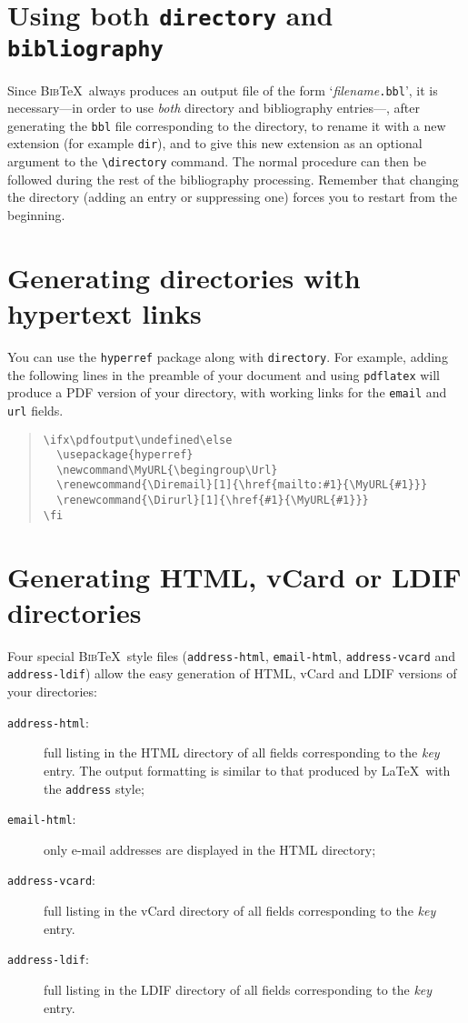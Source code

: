 \documentclass[10pt]{article}
\newcommand\MyURL{\begingroup\Url}
\renewcommand{\Diremail}[1]{\href{mailto:#1}{\MyURL{#1}}}
\renewcommand{\Dirurl}[1]{\href{#1}{\MyURL{#1}}}
\newcommand{\BibTeX}{\textsc{Bib}\TeX}
\newcommand{\Quote}[1]{`{#1}'}
\begin{document}
\section{Using both \texttt{directory} and \texttt{bibliography}}
\label{sec:usingboth}

Since \BibTeX\ always produces an output file of the form
\Quote{\emph{filename}\texttt{.bbl}}, it is necessary---in order to use \emph{both} 
directory and bibliography entries---, after generating the \texttt{bbl} file
corresponding to the directory, to rename it with a new extension (for example
\texttt{dir}), and to give this new extension as an optional argument to the
\verb'\directory' command. The normal procedure can then be followed during the
rest of the bibliography processing. Remember that changing the directory
(adding an entry or suppressing one) forces you to restart from the beginning. 

\section{Generating directories with hypertext links}

You can use the \texttt{hyperref} package along with \texttt{directory}. For
example, adding the following lines in the preamble of your document and
using \texttt{pdflatex} will produce a PDF version of your directory, with
working links for the \verb'email' and \verb'url' fields.

\begin{quote}
\begin{verbatim}
\ifx\pdfoutput\undefined\else
  \usepackage{hyperref}
  \newcommand\MyURL{\begingroup\Url}
  \renewcommand{\Diremail}[1]{\href{mailto:#1}{\MyURL{#1}}}
  \renewcommand{\Dirurl}[1]{\href{#1}{\MyURL{#1}}}
\fi
\end{verbatim}
\end{quote}

\section{Generating HTML, vCard or LDIF directories}

Four special \BibTeX\ style files (\texttt{address-html},
\texttt{email-html}, \texttt{address-vcard} and \texttt{address-ldif}) allow
the easy generation of HTML, vCard and LDIF versions of your directories:

\begin{description}
\item[\textmd{\texttt{address-html}:}] 
full listing in the HTML directory of all fields corresponding to the
\emph{key} entry. The output formatting is similar to that produced by \LaTeX\
with the \texttt{address} style;
\item[\textmd{\texttt{email-html}:}] 
only e-mail addresses are displayed in the HTML directory;
\item[\textmd{\texttt{address-vcard}:}] 
full listing in the vCard directory of all fields corresponding to the
\emph{key} entry.
\item[\textmd{\texttt{address-ldif}:}] 
full listing in the LDIF directory of all fields corresponding to the
\emph{key} entry.
\end{description}
\end{document}
